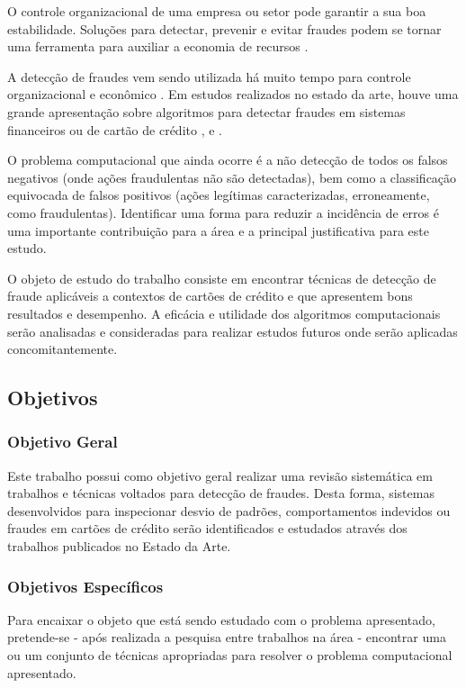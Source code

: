 \documentclass[smallextended]{svjour3}       %
\begin{document}
O controle organizacional de uma empresa ou setor pode garantir a sua boa estabilidade. Soluções para detectar, prevenir e evitar fraudes podem se tornar uma ferramenta para auxiliar a economia de recursos \citep{809570}. 

A detecção de fraudes vem sendo utilizada há muito tempo para controle organizacional e econômico \citep{Seyedhossein2010}. Em estudos realizados no estado da arte, houve uma grande apresentação sobre algoritmos para detectar fraudes em sistemas financeiros ou de cartão de crédito \citep{809570}, \citep{Chandola:2009:ADS:1541880.1541882} e \citep{Abdallah201690}.

O problema computacional que ainda ocorre é a não detecção de todos os falsos negativos (onde ações fraudulentas não são detectadas), bem como a classificação equivocada de falsos positivos (ações legítimas caracterizadas, erroneamente, como fraudulentas). Identificar uma forma para reduzir a incidência de erros é uma importante contribuição para a área e a principal justificativa para este estudo. 

O objeto de estudo do trabalho consiste em encontrar técnicas de detecção de fraude aplicáveis a contextos de cartões de crédito e que apresentem bons resultados e desempenho. A eficácia e utilidade dos algoritmos computacionais serão analisadas e consideradas para realizar estudos futuros onde serão aplicadas concomitantemente.

\subsection{Objetivos}

\subsubsection{Objetivo Geral}
Este trabalho possui como objetivo geral realizar uma revisão sistemática em trabalhos e técnicas voltados para detecção de fraudes. Desta forma, sistemas desenvolvidos para inspecionar desvio de padrões, comportamentos indevidos ou fraudes em cartões de crédito serão identificados e estudados através dos trabalhos publicados no Estado da Arte.

\subsubsection{Objetivos Específicos}

Para encaixar o objeto que está sendo estudado com o problema apresentado, pretende-se - após realizada a pesquisa entre trabalhos na área - encontrar uma ou um conjunto de técnicas apropriadas para resolver o problema computacional apresentado.
\end{document}
